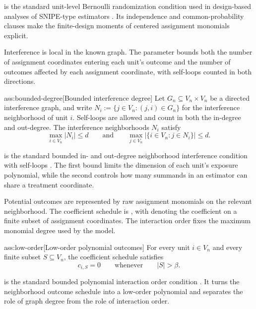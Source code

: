  is the standard unit-level Bernoulli randomization condition used in design-based analyses of SNIPE-type estimators \citep{CortezRodriguezEichhornYu2023}. Its independence and common-probability clauses make the finite-design moments of centered assignment monomials explicit.

Interference is local in the known graph. The parameter  bounds both the number of assignment coordinates entering each unit's outcome and the number of outcomes affected by each assignment coordinate, with self-loops counted in both directions.

\begin{assumptionv}{ass:bounded-degree}[Bounded interference degree]
Let \(G_n\subseteq V_n\times V_n\) be a directed interference graph, and write \(N_i:=\{j\in V_n:(j,i)\in G_n\}\) for the interference neighborhood of unit \(i\). Self-loops are allowed and count in both the in-degree and out-degree. The interference neighborhoods \(N_i\) satisfy
\[
\max_{i\in V_n}|N_i|\le d
\qquad\text{and}\qquad
\max_{j\in V_n}\bigl|\{i\in V_n:j\in N_i\}\bigr|\le d .
\]
\end{assumptionv}

 is the standard bounded in- and out-degree neighborhood interference condition with self-loops \citep{CortezRodriguezEichhornYu2023}. The first bound limits the dimension of each unit's exposure polynomial, while the second controls how many summands in an estimator can share a treatment coordinate.

Potential outcomes are represented by raw assignment monomials on the relevant neighborhood. The coefficient schedule is , with  denoting the coefficient on a finite subset  of assignment coordinates. The interaction order  fixes the maximum monomial degree used by the model.

\begin{assumptionv}{ass:low-order}[Low-order polynomial outcomes]
For every unit \(i\in V_n\) and every finite subset \(S\subseteq V_n\), the coefficient schedule satisfies
\[
c_{i,S}=0
\qquad\text{whenever}\qquad
|S|>\beta .
\]
\end{assumptionv}

 is the standard bounded polynomial interaction order condition \citep{CortezRodriguezEichhornYu2023}. It turns the neighborhood outcome schedule into a low-order polynomial and separates the role of graph degree from the role of interaction order.

